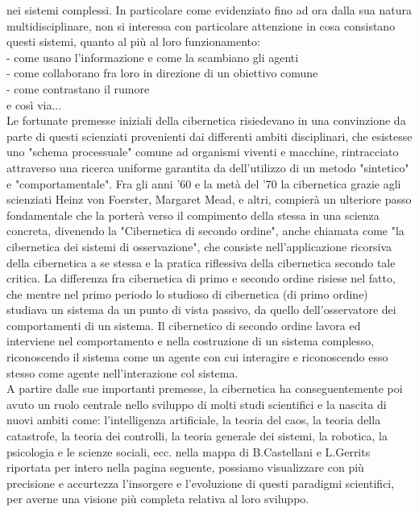 nei sistemi complessi.
In particolare come evidenziato fino ad ora dalla sua natura multidisciplinare,
non si interessa con particolare attenzione in cosa consistano questi sistemi,
quanto al più al loro funzionamento:
\\
- come usano l'informazione e come la scambiano gli agenti
\\
- come collaborano fra loro in direzione di un obiettivo comune
\\
- come contrastano il rumore
\\
e così via...
\\
Le fortunate premesse iniziali della cibernetica risiedevano in una convinzione
da parte di questi scienziati provenienti dai differenti ambiti disciplinari, che esistesse uno
"schema processuale" comune ad organismi viventi e macchine, rintracciato attraverso una ricerca uniforme garantita da dell'utilizzo di un metodo "sintetico" e "comportamentale".
Fra gli anni '60 e la metà del '70 la cibernetica grazie agli scienziati
Heinz von Foerster, Margaret Mead, e altri,
compierà un ulteriore passo fondamentale che la porterà
verso il compimento della stessa in una scienza concreta, divenendo la "Cibernetica di secondo ordine",
anche chiamata come "la cibernetica dei sistemi di osservazione", che consiste nell'applicazione
ricorsiva della cibernetica a se stessa e la pratica riflessiva della cibernetica
secondo tale critica.
La differenza fra cibernetica di primo e secondo ordine risiese nel fatto,
che mentre nel primo periodo lo studioso di cibernetica (di primo ordine)
studiava un sistema da un punto di vista passivo, da quello dell'osservatore
dei comportamenti di un sistema.
Il  cibernetico di secondo ordine lavora ed interviene nel comportamento
e nella costruzione di un sistema complesso,
riconoscendo il sistema come un agente con cui interagire e
riconoscendo esso stesso come agente nell'interazione col sistema.
\\
A partire dalle sue importanti premesse,
la cibernetica ha conseguentemente poi avuto un ruolo centrale nello sviluppo di
molti studi scientifici e la nascita
di nuovi ambiti come: l'intelligenza artificiale, la teoria del caos,
la teoria della catastrofe,
la teoria dei controlli, la teoria generale dei sistemi, la robotica,
la psicologia e le scienze sociali,
ecc.
nella mappa di B.Castellani e L.Gerrits riportata per intero nella pagina seguente,
possiamo visualizzare con più precisione e accurtezza
l'insorgere e l'evoluzione di questi paradigmi scientifici, per averne una
visione più completa relativa al loro sviluppo.


